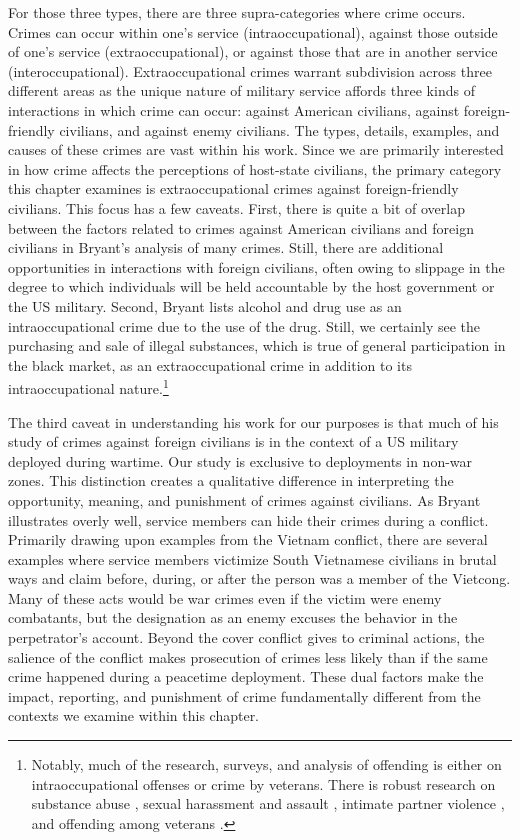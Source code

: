 For those three types, there are three supra-categories where crime occurs. Crimes can occur within one's service (intraoccupational), against those outside of one's service (extraoccupational), or against those that are in another service (interoccupational). Extraoccupational crimes warrant subdivision across three different areas as the unique nature of military service affords three kinds of interactions in which crime can occur: against American civilians, against foreign-friendly civilians, and against enemy civilians.  The types, details, examples, and causes of these crimes are vast within his work. Since we are primarily interested in how crime affects the perceptions of host-state civilians, the primary category this chapter examines is extraoccupational crimes against foreign-friendly civilians. This focus has a few caveats. First, there is quite a bit of overlap between the factors related to crimes against American civilians and foreign civilians in Bryant's analysis of many crimes. Still, there are additional opportunities in interactions with foreign civilians, often owing to slippage in the degree to which individuals will be held accountable by the host government or the US military. Second, Bryant lists alcohol and drug use as an intraoccupational crime due to the use of the drug. Still, we certainly see the purchasing and sale of illegal substances, which is true of general participation in the black market, as an extraoccupational crime in addition to its intraoccupational nature.\footnote{Notably, much of the research, surveys, and analysis of offending is either on intraoccupational offenses or crime by veterans. There is robust research on substance abuse \cite[see:][]{bray2010}, sexual harassment and assault \cite[see:][]{bostock2007,stander2016}, intimate partner violence \cite[see:][]{sparrow2020}, and offending among veterans \cite[see:][]{moorhead2021}.}

The third caveat in understanding his work for our purposes is that much of his study of crimes against foreign civilians is in the context of a US military deployed during wartime. Our study is exclusive to deployments in non-war zones. This distinction creates a qualitative difference in interpreting the opportunity, meaning, and punishment of crimes against civilians. As Bryant illustrates overly well, service members can hide their crimes during a conflict. Primarily drawing upon examples from the Vietnam conflict, there are several examples where service members victimize South Vietnamese civilians in brutal ways and claim before, during, or after the person was a member of the Vietcong. Many of these acts would be war crimes even if the victim were enemy combatants, but the designation as an enemy excuses the behavior in the perpetrator's account. Beyond the cover conflict gives to criminal actions, the salience of the conflict makes prosecution of crimes less likely than if the same crime happened during a peacetime deployment. These dual factors make the impact, reporting, and punishment of crime fundamentally different from the contexts we examine within this chapter.  

